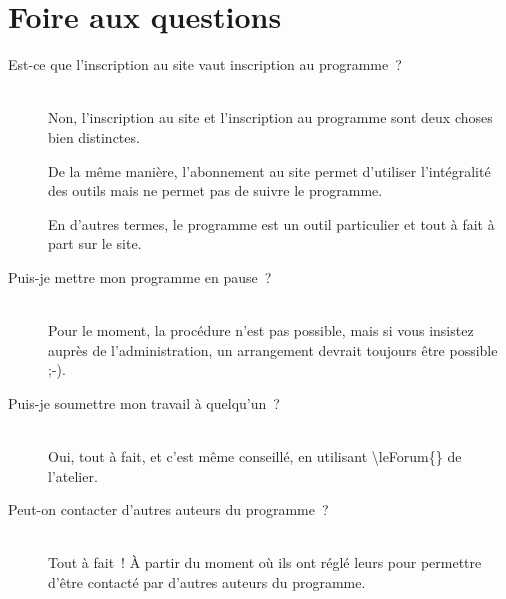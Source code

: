 % 
% 
% 
% 
% 
% 
% 
% 

\section{Foire aux questions}\hypertarget{faq}{}\label{faq}

\begin{description}
\item[Est-ce que l'inscription au site vaut inscription au programme~{}?] \hfill \\
 Non, l'inscription au site \boa{} et l'inscription au programme \unan{} sont deux choses bien distinctes.



De la même manière, l'abonnement au site permet d'utiliser l'intégralité des outils mais ne permet pas de suivre le programme.



En d'autres termes, le programme \unan{} est un outil particulier et tout à fait à part sur le site.



\item[Puis-je mettre mon programme en pause~{}?] \hfill \\
 Pour le moment, la procédure n'est pas possible, mais si vous insistez auprès de l'administration, un arrangement devrait toujours être possible ;-).



\item[Puis-je soumettre mon travail à quelqu'un~{}?] \hfill \\
 Oui, tout à fait, et c'est même conseillé, en utilisant \textbackslash{}leForum\{\} de l'atelier.



\item[Peut-on contacter d'autres auteurs du programme~{}?] \hfill \\
 Tout à fait~{}! À partir du moment où ils ont réglé leurs \preferences{} pour permettre d'être contacté par d'autres auteurs du programme.
\end{description}

